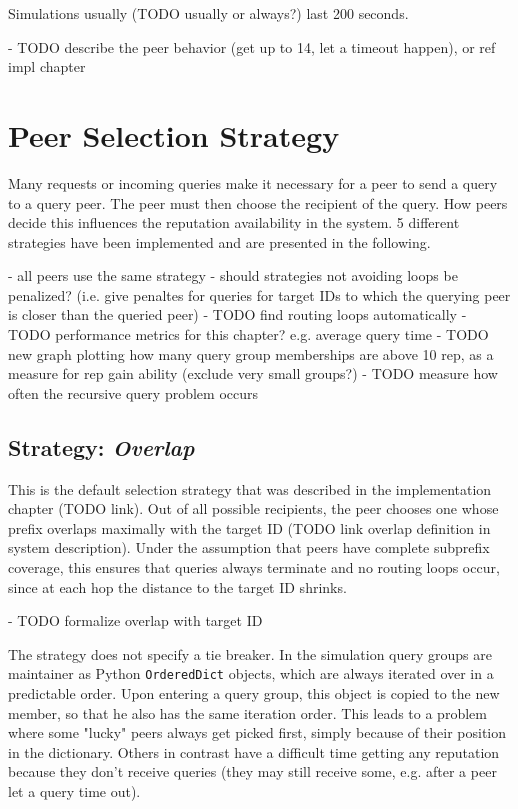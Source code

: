 Simulations usually (TODO usually or always?) last 200 seconds.

- TODO describe the peer behavior (get up to 14, let a timeout happen), or ref
  impl chapter

\section{Peer Selection Strategy}
Many requests or incoming queries make it necessary for a peer to send a query
to a query peer. The peer must then choose the recipient of the query. How peers
decide this influences the reputation availability in the system. 5 different
strategies have been implemented and are presented in the following.

- all peers use the same strategy
- should strategies not avoiding loops be penalized? (i.e. give penaltes for
  queries for target IDs to which the querying peer is closer than the queried
  peer)
- TODO find routing loops automatically
- TODO performance metrics for this chapter? e.g. average query time
- TODO new graph plotting how many query group memberships are above 10 rep, as
  a measure for rep gain ability (exclude very small groups?)
- TODO measure how often the recursive query problem occurs

\subsection{Strategy: \emph{Overlap}}
This is the default selection strategy that was described in the implementation
chapter (TODO link). Out of all possible recipients, the peer chooses one whose
prefix overlaps maximally with the target ID (TODO link overlap definition in
system description). Under the assumption that peers have complete subprefix
coverage, this ensures that queries always terminate and no routing loops occur,
since at each hop the distance to the target ID shrinks.

- TODO formalize overlap with target ID

The strategy does not specify a tie breaker. In the simulation query groups are
maintainer as Python \texttt{OrderedDict} objects, which are always iterated
over in a predictable order. Upon entering a query group, this object is copied
to the new member, so that he also has the same iteration order. This leads to a
problem where some "lucky" peers always get picked first, simply because of
their position in the dictionary. Others in contrast have a difficult time
getting any reputation because they don't receive queries (they may still
receive some, e.g.  after a peer let a query time out).


